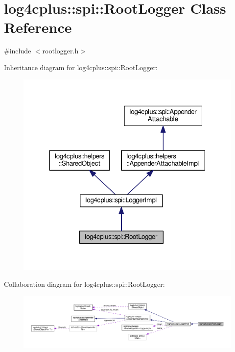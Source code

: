 \hypertarget{classlog4cplus_1_1spi_1_1RootLogger}{\section{log4cplus\-:\-:spi\-:\-:Root\-Logger Class Reference}
\label{classlog4cplus_1_1spi_1_1RootLogger}
}


{\ttfamily \#include $<$rootlogger.\-h$>$}



Inheritance diagram for log4cplus\-:\-:spi\-:\-:Root\-Logger\-:
\nopagebreak
\begin{figure}[H]
\begin{center}
\leavevmode
\includegraphics[width=318pt]{classlog4cplus_1_1spi_1_1RootLogger__inherit__graph}
\end{center}
\end{figure}


Collaboration diagram for log4cplus\-:\-:spi\-:\-:Root\-Logger\-:
\nopagebreak
\begin{figure}[H]
\begin{center}
\leavevmode
\includegraphics[width=350pt]{classlog4cplus_1_1spi_1_1RootLogger__coll__graph}
\end{center}
\end{figure}
